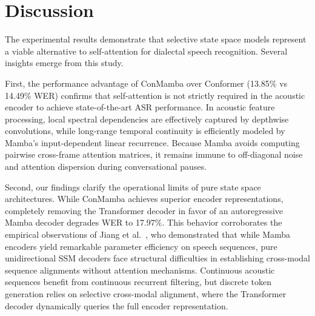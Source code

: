 \documentclass[journal]{IEEEtran}
\begin{document}
\begin{table}[!t]
\centering
\caption{Linguistic Error Breakdown Across Dialectal Egyptian Arabic Phonetic Phenomena on the Held-Out Test Set.}
\label{tab:dialectal_errors}
\end{table}

\section{Discussion}
\label{sec:discussion}
The experimental results demonstrate that selective state space models represent a viable alternative to self-attention for dialectal speech recognition. Several insights emerge from this study.

First, the performance advantage of ConMamba over Conformer (13.85\% vs 14.49\% WER) confirms that self-attention is not strictly required in the acoustic encoder to achieve state-of-the-art ASR performance. In acoustic feature processing, local spectral dependencies are effectively captured by depthwise convolutions, while long-range temporal continuity is efficiently modeled by Mamba's input-dependent linear recurrence. Because Mamba avoids computing pairwise cross-frame attention matrices, it remains immune to off-diagonal noise and attention dispersion during conversational pauses.

Second, our findings clarify the operational limits of pure state space architectures. While ConMamba achieves superior encoder representations, completely removing the Transformer decoder in favor of an autoregressive Mamba decoder degrades WER to 17.97\%. This behavior corroborates the empirical observations of Jiang et al.~\cite{jiang2024speechslytherin}, who demonstrated that while Mamba encoders yield remarkable parameter efficiency on speech sequences, pure unidirectional SSM decoders face structural difficulties in establishing cross-modal sequence alignments without attention mechanisms. Continuous acoustic sequences benefit from continuous recurrent filtering, but discrete token generation relies on selective cross-modal alignment, where the Transformer decoder dynamically queries the full encoder representation.
\end{document}
